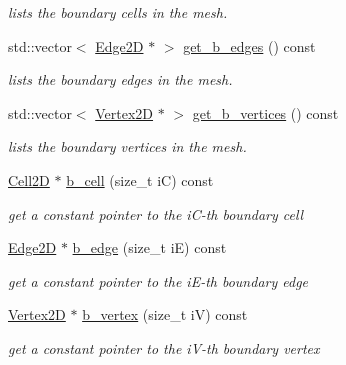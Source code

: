 \begin{DoxyCompactItemize}
\begin{DoxyCompactList}\small\item\em lists the boundary cells in the mesh. \end{DoxyCompactList}\item 
std\+::vector$<$ \hyperlink{classHCore2D_1_1Edge2D}{Edge2D} $\ast$ $>$ \hyperlink{group__Mesh2D_ga6b288e71c68bb63396fd4402bc625178}{get\+\_\+b\+\_\+edges} () const
\begin{DoxyCompactList}\small\item\em lists the boundary edges in the mesh. \end{DoxyCompactList}\item 
std\+::vector$<$ \hyperlink{classHCore2D_1_1Vertex2D}{Vertex2D} $\ast$ $>$ \hyperlink{group__Mesh2D_ga45e9b09d6098e6cee5d19b7a8fcdfa2a}{get\+\_\+b\+\_\+vertices} () const
\begin{DoxyCompactList}\small\item\em lists the boundary vertices in the mesh. \end{DoxyCompactList}\item 
\mbox{\label{classHCore2D_1_1Mesh2D_ac0bde8b9d9ddf8a4ef3d60e36efbdf61}} 
\hyperlink{classHCore2D_1_1Cell2D}{Cell2D} $\ast$ \hyperlink{classHCore2D_1_1Mesh2D_ac0bde8b9d9ddf8a4ef3d60e36efbdf61}{b\+\_\+cell} (size\+\_\+t iC) const
\begin{DoxyCompactList}\small\item\em get a constant pointer to the i\+C-\/th boundary cell \end{DoxyCompactList}\item 
\mbox{\label{classHCore2D_1_1Mesh2D_af8f54d47f1b75c185af7551e11c811f2}} 
\hyperlink{classHCore2D_1_1Edge2D}{Edge2D} $\ast$ \hyperlink{classHCore2D_1_1Mesh2D_af8f54d47f1b75c185af7551e11c811f2}{b\+\_\+edge} (size\+\_\+t iE) const
\begin{DoxyCompactList}\small\item\em get a constant pointer to the i\+E-\/th boundary edge \end{DoxyCompactList}\item 
\mbox{\label{classHCore2D_1_1Mesh2D_a843c1fa9dcbff99667a03d3f4d45bcb9}} 
\hyperlink{classHCore2D_1_1Vertex2D}{Vertex2D} $\ast$ \hyperlink{classHCore2D_1_1Mesh2D_a843c1fa9dcbff99667a03d3f4d45bcb9}{b\+\_\+vertex} (size\+\_\+t iV) const
\begin{DoxyCompactList}\small\item\em get a constant pointer to the i\+V-\/th boundary vertex \end{DoxyCompactList}\item 

\end{DoxyCompactItemize}
